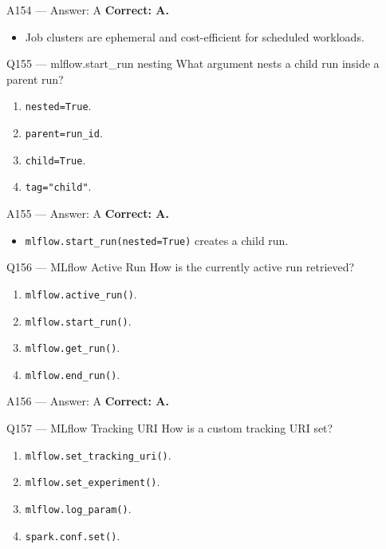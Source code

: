\documentclass[aspectratio=169,9pt]{beamer}
\begin{document}
	\begin{frame}{A154 --- Answer: A}
		\textbf{Correct: A.}
		\begin{itemize}
			\item Job clusters are ephemeral and cost-efficient for scheduled workloads.
		\end{itemize}
	\end{frame}
	
	\begin{frame}{Q155 --- mlflow.start\_run nesting}
		What argument nests a child run inside a parent run?
		\begin{enumerate}[label=\Alph*.]
			\item \texttt{nested=True}.
			\item \texttt{parent=run\_id}.
			\item \texttt{child=True}.
			\item \texttt{tag="child"}.
		\end{enumerate}
	\end{frame}
	
	\begin{frame}{A155 --- Answer: A}
		\textbf{Correct: A.}
		\begin{itemize}
			\item \texttt{mlflow.start\_run(nested=True)} creates a child run.
		\end{itemize}
	\end{frame}
	
	\begin{frame}{Q156 --- MLflow Active Run}
		How is the currently active run retrieved?
		\begin{enumerate}[label=\Alph*.]
			\item \texttt{mlflow.active\_run()}.
			\item \texttt{mlflow.start\_run()}.
			\item \texttt{mlflow.get\_run()}.
			\item \texttt{mlflow.end\_run()}.
		\end{enumerate}
	\end{frame}
	
	\begin{frame}{A156 --- Answer: A}
		\textbf{Correct: A.}
	\end{frame}
	
	\begin{frame}{Q157 --- MLflow Tracking URI}
		How is a custom tracking URI set?
		\begin{enumerate}[label=\Alph*.]
			\item \texttt{mlflow.set\_tracking\_uri()}.
			\item \texttt{mlflow.set\_experiment()}.
			\item \texttt{mlflow.log\_param()}.
			\item \texttt{spark.conf.set()}.
		\end{enumerate}
	\end{frame}
	
\end{document}
